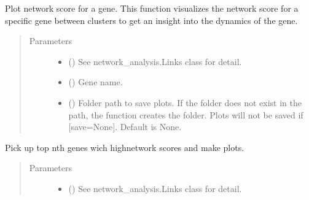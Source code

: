 \documentclass[letterpaper,10pt,english]{sphinxmanual}
\begin{document}
\begin{fulllineitems}
\begin{fulllineitems}
\label{\detokenize{modules/celloracle:celloracle.Links.plot_score_per_cluster}}
Plot network score for a gene.
This function visualizes the network score for a specific gene between clusters to get an insight into the dynamics of the gene.
\begin{quote}\begin{description}
\item[{Parameters}] \leavevmode\begin{itemize}
\item {} 
 ({\hyperref[\detokenize{modules/celloracle:celloracle.Links}]{}}) \textendash{} See network\_analysis.Links class for detail.

\item {} 
 () \textendash{} Gene name.

\item {} 
 () \textendash{} Folder path to save plots. If the folder does not exist in the path, the function creates the folder.
Plots will not be saved if {[}save=None{]}. Default is None.

\end{itemize}

\end{description}\end{quote}

\end{fulllineitems}


\begin{fulllineitems}
\label{\detokenize{modules/celloracle:celloracle.Links.plot_scores_as_rank}}
Pick up top n\sphinxhyphen{}th genes wich high\sphinxhyphen{}network scores and make plots.
\begin{quote}\begin{description}
\item[{Parameters}] \leavevmode\begin{itemize}
\item {} 
 ({\hyperref[\detokenize{modules/celloracle:celloracle.Links}]{}}) \textendash{} See network\_analysis.Links class for detail.


\end{itemize}
\end{description}
\end{quote}
\end{fulllineitems}
\end{fulllineitems}
\end{document}
